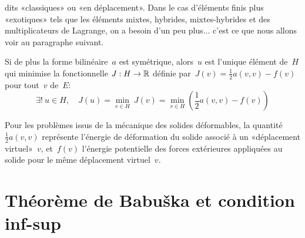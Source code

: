 \medskip
{} dits «classiques» ou «en déplacement».
Dans le cas d'éléments finis plus «exotiques» tels que les éléments
mixtes, hybrides, mixtes-hybrides et des multiplicateurs de Lagrange, on a besoin d'un peu plus... c'est ce que nous allons voir au paragraphe suivant.


\begin{theoreme}
Si de plus la forme bilinéaire~$a$ est symétrique, alors~$u$ est
l'unique élément de~$H$ qui minimise la fonctionnelle
$J: H\rightarrow\mathbb R$ définie par~$J(v) = \frac12 a(v,v)-f(v)$ pour tout~$v$ de~$E$:
\begin{equation}
\exists!\ u \in H,\quad J(u) = \min_{v\in H}\ J(v) = \min_{v\in H} \left( \frac12 a(v,v) - f(v) \right)
\end{equation}
\end{theoreme}


\medskip



Pour les problèmes issus de la mécanique des solides déformables, la quantité~$\frac12 a(v,v)$ représente l'énergie de déformation du solide associé à un «déplacement virtuel»~$v$, et~$f(v)$ l'énergie potentielle des forces extérieures appliquées au solide pour le même déplacement virtuel~$v$.


\medskip
\section{Théorème de Babuška et condition inf-sup}\label{Sec-ThBabuska}



